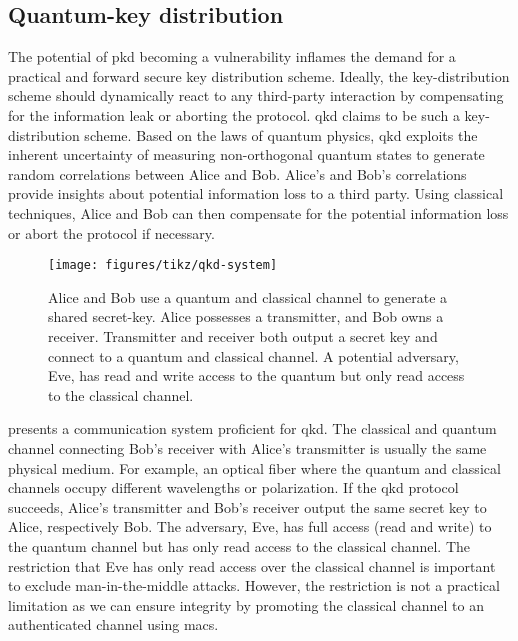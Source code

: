 \FloatBarrier
\subsection{Quantum-key distribution}

The potential of \gls{pkd} becoming a vulnerability inflames the demand for a practical and forward secure key distribution scheme.
Ideally, the key-distribution scheme should dynamically react to any third-party interaction by compensating for the information leak or aborting the protocol.
\gls{qkd} claims to be such a key-distribution scheme.
Based on the laws of quantum physics, \gls{qkd} exploits the inherent uncertainty of measuring non-orthogonal quantum states to generate random correlations between Alice and Bob.
Alice's and Bob's correlations provide insights about potential information loss to a third party.
Using classical techniques, Alice and Bob can then compensate for the potential information loss or abort the protocol if necessary.
\begin{figure}[htb]
	\centering
	\texttt{[image: figures/tikz/qkd-system]}
	\caption{Alice and Bob use a quantum and classical channel to generate a shared secret-key. Alice possesses a transmitter, and Bob owns a receiver. Transmitter and receiver both output a secret key and connect to a quantum and classical channel. A potential adversary, Eve, has read and write access to the quantum but only read access to the classical channel.}\label{fig:qkd_system}
\end{figure}
 presents a communication system proficient for \gls{qkd}.
The classical and quantum channel connecting Bob's receiver with Alice's transmitter is usually the same physical medium.
For example, an optical fiber where the quantum and classical channels occupy different wavelengths or polarization.
If the \gls{qkd} protocol succeeds, Alice's transmitter and Bob's receiver output the same secret key to Alice, respectively Bob.
The adversary, Eve, has full access (read and write) to the quantum channel but has only read access to the classical channel.
The restriction that Eve has only read access over the classical channel is important to exclude man-in-the-middle attacks.
However, the restriction is not a practical limitation as we can ensure integrity by promoting the classical channel to an authenticated channel using \glspl{mac}.

